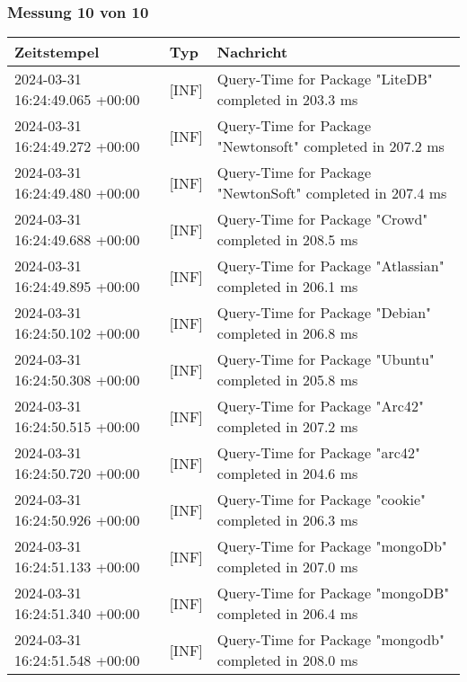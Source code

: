     \subsubsection{Messung 10 von 10} \label{subsubsec:MySQLOhneIndex10von10}
        {
            {\small
                \begin{tabularx}{\textwidth}{|l|l|X|}
                    \hline
                    \textbf{Zeitstempel} & \textbf{Typ} & \textbf{Nachricht} \\
                    \hline
                    \endhead
                    2024-03-31 16:24:49.065 +00:00 & [INF] & Query-Time for Package "LiteDB" completed in 203.3 ms \\
                    2024-03-31 16:24:49.272 +00:00 & [INF] & Query-Time for Package "Newtonsoft" completed in 207.2 ms \\
                    2024-03-31 16:24:49.480 +00:00 & [INF] & Query-Time for Package "NewtonSoft" completed in 207.4 ms \\
                    2024-03-31 16:24:49.688 +00:00 & [INF] & Query-Time for Package "Crowd" completed in 208.5 ms \\
                    2024-03-31 16:24:49.895 +00:00 & [INF] & Query-Time for Package "Atlassian" completed in 206.1 ms \\
                    2024-03-31 16:24:50.102 +00:00 & [INF] & Query-Time for Package "Debian" completed in 206.8 ms \\
                    2024-03-31 16:24:50.308 +00:00 & [INF] & Query-Time for Package "Ubuntu" completed in 205.8 ms \\
                    2024-03-31 16:24:50.515 +00:00 & [INF] & Query-Time for Package "Arc42" completed in 207.2 ms \\
                    2024-03-31 16:24:50.720 +00:00 & [INF] & Query-Time for Package "arc42" completed in 204.6 ms \\
                    2024-03-31 16:24:50.926 +00:00 & [INF] & Query-Time for Package "cookie" completed in 206.3 ms \\
                    2024-03-31 16:24:51.133 +00:00 & [INF] & Query-Time for Package "mongoDb" completed in 207.0 ms \\
                    2024-03-31 16:24:51.340 +00:00 & [INF] & Query-Time for Package "mongoDB" completed in 206.4 ms \\
                    2024-03-31 16:24:51.548 +00:00 & [INF] & Query-Time for Package "mongodb" completed in 208.0 ms \\

\end{tabularx}}}
